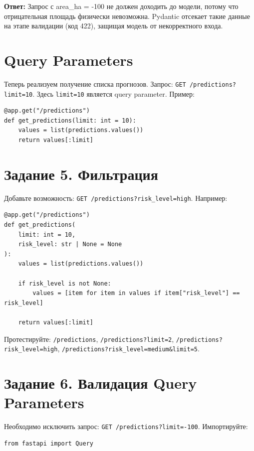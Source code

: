 \documentclass[12pt,a4paper]{article}
\begin{document}
\textbf{Ответ:} Запрос с area\_ha = -100 не должен доходить до модели, потому что отрицательная площадь физически невозможна. Pydantic отсекает такие данные на этапе валидации (код 422), защищая модель от некорректного входа.

\section{Query Parameters}

Теперь реализуем получение списка прогнозов. Запрос: \texttt{GET /predictions?limit=10}. Здесь \texttt{limit=10} является query parameter. Пример:

\begin{lstlisting}[caption={Endpoint /predictions}]
@app.get("/predictions")
def get_predictions(limit: int = 10):
    values = list(predictions.values())
    return values[:limit]
\end{lstlisting}

\section{Задание 5. Фильтрация}

Добавьте возможность: \texttt{GET /predictions?risk\_level=high}. Например:

\begin{lstlisting}[caption={/predictions с фильтрацией}]
@app.get("/predictions")
def get_predictions(
    limit: int = 10,
    risk_level: str | None = None
):
    values = list(predictions.values())

    if risk_level is not None:
        values = [item for item in values if item["risk_level"] == risk_level]

    return values[:limit]
\end{lstlisting}

Протестируйте: \texttt{/predictions}, \texttt{/predictions?limit=2}, \texttt{/predictions?risk\_level=high}, \texttt{/predictions?risk\_level=medium\&limit=5}.

\section{Задание 6. Валидация Query Parameters}

Необходимо исключить запрос: \texttt{GET /predictions?limit=-100}. Импортируйте:

\begin{lstlisting}[caption={Импорт Query}]
from fastapi import Query
\end{lstlisting}
\end{document}
